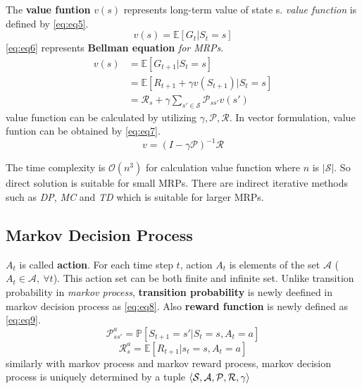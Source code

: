 \documentclass[
	10pt, %
]{article}
\newcommand{\mbb}[1]{\mathbb{#1}}
\newcommand{\mc}[1]{\mathcal{#1}}
\newcommand{\tb}[1]{\textbf{#1}}
\newcommand{\ti}[1]{\textit{#1}}
\begin{document}
The \tb{value funtion} $v(s)$ represents long-term value of state s. \ti{value function} is defined by \cref{eq:eq5}.
\begin{equation} \label{eq:eq5}
    v(s) = \mbb{E}[G_t|S_t=s]
\end{equation}
\cref{eq:eq6} represents \tb{Bellman equation} \ti{for MRPs}.
\begin{equation} \label{eq:eq6}
\begin{aligned}
    v(s) &= \mbb{E}[G_{t+1}|S_t = s] \\
    &= \mbb{E}[R_{t+1} + \gamma v(S_{t+1})|S_t = s] \\
    &= \mc{R}_s + \gamma \sum_{s' \in \mc{S}} \mc{P}_{ss'}v(s')
\end{aligned}
\end{equation}
value function can be calculated by utilizing $\gamma, \mc{P}, \mc{R}$. 
In vector formulation, value funtion can be obtained by \cref{eq:eq7}.
\begin{equation} \label{eq:eq7}
    v = (I - \gamma \mc{P})^{-1}\mc{R}
\end{equation}

The time complexity is $\mc{O}(n^3)$ for calculation value function where $n$ is $|\mc{S}|$.
So direct solution is suitable for small MRPs.
There are indirect iterative methods such as \ti{DP}, \ti{MC} and \ti{TD} which is suitable for larger MRPs.


\subsection{Markov Decision Process}
$A_t$ is called \tb{action}. For each time step $t$, action $A_t$ is elements of the set $\mc{A}$ ($A_t \in \mc{A},\ \forall t$). This action set can be both finite and infinite set. Unlike transition probability in \ti{markov process}, \tb{transition probability} is newly deefined in markov decision process as \cref{eq:eq8}. Also \tb{reward function} is newly defined as \cref{eq:eq9}.
\begin{equation} \label{eq:eq8}
    \mc{P}_{ss'}^a = \mbb{P}[S_{t+1}=s'|S_t=s, A_t=a]
\end{equation}
\begin{equation} \label{eq:eq9}
    \mc{R}_{s}^a = \mbb{E}[R_{t+1}|s_{t}=s,A_t=a]
\end{equation}
similarly with markov process and markov reward process, markov decision process is uniquely determined by a tuple $\braket{\mc{S}, \mc{A}, \mc{P}, \mc{R}, \gamma}$
\end{document}
